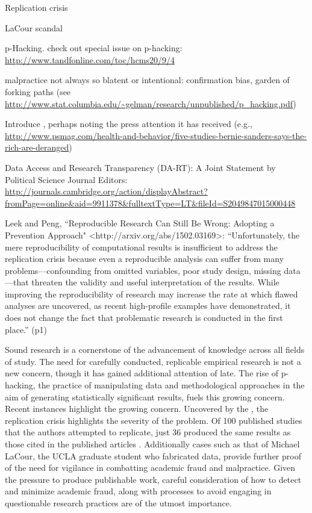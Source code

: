 
Replication crisis

LaCour scandal

p-Hacking.  check out special issue on p-hacking: \url{http://www.tandfonline.com/toc/hcms20/9/4}

malpractice not always so blatent or intentional: confirmation bias, garden of forking paths (see \url{http://www.stat.columbia.edu/~gelman/research/unpublished/p_hacking.pdf})

Introduce \citet{Newman2015}, perhaps noting the press attention it has received (e.g., \url{http://www.psmag.com/health-and-behavior/five-studies-bernie-sanders-says-the-rich-are-deranged})

Data Access and Research Transparency (DA-RT): A Joint Statement by Political Science Journal Editors: \url{http://journals.cambridge.org/action/displayAbstract?fromPage=online&aid=9911378&fulltextType=LT&fileId=S2049847015000448}

Leek and Peng, ``Reproducible Research Can Still Be Wrong: Adopting a Prevention Approach" <http://arxiv.org/abs/1502.03169>: ``Unfortunately, the mere reproducibility of computational results is insufficient to address the replication crisis because even a reproducible analysis can suffer from many problems—confounding from omitted variables, poor study design, missing data—that threaten the validity and useful interpretation of the results. While improving the reproducibility of research may increase the rate at which flawed analyses are uncovered, as recent high-profile examples have demonstrated, it does not change the fact that problematic research is conducted in the first place.'' (p1)

Sound research is a cornerstone of the advancement of knowledge across all fields of study. The need for carefully conducted, replicable empirical research is not a new concern, though it has gained additional attention of late. The rise of p-hacking, the practice of manipulating data and methodological approaches in the aim of generating statistically significant results, fuels this growing concern. Recent instances highlight the growing concern. Uncovered by the \citet{OpenScienceCollaboration2015}, the replication crisis highlights the severity of the problem. Of 100 published studies that the authors attempted to replicate, just 36 produced the same results as those cited in the published articles \citep{OpenScienceCollaboration2015}. Additionally cases such as that of Michael LaCour, the UCLA graduate student who fabricated data, provide further proof of the need for vigilance in combatting academic fraud and malpractice. Given the pressure to produce publishable work, careful consideration of how to detect and minimize academic fraud, along with processes to avoid engaging in questionable research practices are of the utmost importance.


